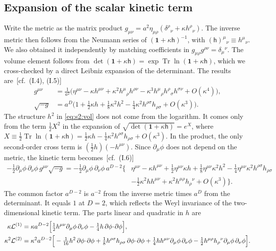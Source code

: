 \documentclass[aps,prd,onecolumn,10pt,nofootinbib,floatfix]{revtex4-2}
\newcommand{\eqI}[1]{(I.#1)}
\begin{document}
\subsection{Expansion of the scalar kinetic term}
\label{sec:s2:expansion}

Write the metric as the matrix product $g_{\mu\nu}=a^2\eta_{\mu\rho}(\delta^\rho{}_\nu+\kappa h^\rho{}_\nu)$.
The inverse metric then follows from the Neumann series of
$(\mathbf 1+\kappa\mathsf h)^{-1}$, with $(\mathsf h)^\mu{}_\nu\equiv h^\mu{}_\nu$.
We also obtained it independently by matching coefficients in
$g_{\mu\rho}g^{\rho\nu}=\delta_\mu{}^\nu$. The volume element follows from
$\det(\mathbf 1+\kappa\mathsf h)=\exp\operatorname{Tr}\ln(\mathbf 1+\kappa\mathsf h)$,
which we cross-checked by a direct Leibniz expansion of the determinant. The
results are~[cf.\ \eqI{4}, \eqI{5}]
\begin{align}
g^{\mu\nu}&=\frac{1}{a^2}\Big(\eta^{\mu\nu}-\kappa h^{\mu\nu}+\kappa^2h^\mu{}_\rho h^{\rho\nu}
-\kappa^3h^\mu{}_\rho h^\rho{}_\sigma h^{\sigma\nu}+O(\kappa^4)\Big),
\label{eq:s2:ginv}\\
\sqrt{-g}&=a^D\Big(1+\tfrac12\kappa h+\tfrac18\kappa^2h^2-\tfrac14\kappa^2h^{\rho\sigma}h_{\rho\sigma}+O(\kappa^3)\Big).
\label{eq:s2:vol}
\end{align}
The structure $h^2$ in \eqref{eq:s2:vol} does not come from the logarithm.
It comes only from the term $\tfrac12X^2$ in the expansion of
$\sqrt{\det(\mathbf 1+\kappa\mathsf h)}=e^X$, where
$X\equiv\tfrac12\operatorname{Tr}\ln(\mathbf 1+\kappa\mathsf h)
=\tfrac12\kappa h-\tfrac14\kappa^2h^{\rho\sigma}h_{\rho\sigma}+O(\kappa^3)$.
In the product, the only second-order cross term is
$(\tfrac12h)(-h^{\mu\nu})$. Since $\partial_\mu\phi$ does not depend on the
metric, the kinetic term becomes~[cf.\ \eqI{6}]
\begin{equation}
\begin{aligned}
-\tfrac12\partial_\mu\phi\,\partial_\nu\phi\,g^{\mu\nu}\sqrt{-g}
=-\tfrac12\partial_\mu\phi\,\partial_\nu\phi\,a^{D-2}\Big\{&\eta^{\mu\nu}-\kappa h^{\mu\nu}+\tfrac12\eta^{\mu\nu}\kappa h
+\tfrac18\eta^{\mu\nu}\kappa^2h^2-\tfrac14\eta^{\mu\nu}\kappa^2h^{\rho\sigma}h_{\rho\sigma}\\
&-\tfrac12\kappa^2hh^{\mu\nu}+\kappa^2h^{\mu\rho}h_\rho{}^\nu+O(\kappa^3)\Big\}.
\end{aligned}
\label{eq:s2:eq6}
\end{equation}
The common factor $a^{D-2}$ is $a^{-2}$ from the inverse metric times $a^D$
from the determinant. It equals $1$ at $D=2$, which reflects the Weyl
invariance of the two-dimensional kinetic term. The parts linear and
quadratic in $h$ are
\begin{align}
\kappa\mathcal L^{(1)}&=\kappa a^{D-2}\Big[\tfrac12h^{\mu\nu}\partial_\mu\phi\,\partial_\nu\phi-\tfrac14h\,\partial\phi\!\cdot\!\partial\phi\Big],
\label{eq:s2:L1}\\
\kappa^2\mathcal L^{(2)}&=\kappa^2a^{D-2}\Big[-\tfrac1{16}h^2\,\partial\phi\!\cdot\!\partial\phi+\tfrac18h^{\rho\sigma}h_{\rho\sigma}\,\partial\phi\!\cdot\!\partial\phi
+\tfrac14hh^{\mu\nu}\partial_\mu\phi\,\partial_\nu\phi-\tfrac12h^{\mu\rho}h_\rho{}^\nu\partial_\mu\phi\,\partial_\nu\phi\Big].
\label{eq:s2:L2}
\end{align}
\end{document}
